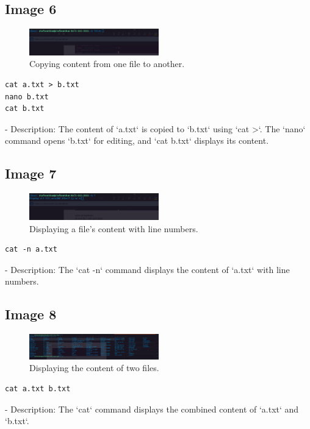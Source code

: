 \documentclass[12pt]{article}
\begin{document}
\subsection*{Image 6}
\begin{figure}[h!]
    \centering
    \includegraphics[width=0.5\textwidth]{6.png}
    \caption{Copying content from one file to another.}
\end{figure}
\begin{lstlisting}
cat a.txt > b.txt
nano b.txt
cat b.txt
\end{lstlisting}
- Description: The content of `a.txt` is copied to `b.txt` using `cat >`. The `nano` command opens `b.txt` for editing, and `cat b.txt` displays its content.

\subsection*{Image 7}
\begin{figure}[h!]
    \centering
    \includegraphics[width=0.5\textwidth]{7.png}
    \caption{Displaying a file's content with line numbers.}
\end{figure}
\begin{lstlisting}
cat -n a.txt
\end{lstlisting}
- Description: The `cat -n` command displays the content of `a.txt` with line numbers.

\subsection*{Image 8}
\begin{figure}[h!]
    \centering
    \includegraphics[width=0.5\textwidth]{8.png}
    \caption{Displaying the content of two files.}
\end{figure}
\begin{lstlisting}
cat a.txt b.txt
\end{lstlisting}
- Description: The `cat` command displays the combined content of `a.txt` and `b.txt`.
\end{document}
